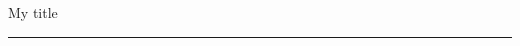 \documentclass{sleekcv}%
\begin{document}
%
\reportmacrodefn\switchcolumn
\begin{margincol}%
My title
\hrule
\lipsum%
\end{margincol}%
%
\begin{bodycol}%
\lipsum%
\end{bodycol}%
\end{document}
